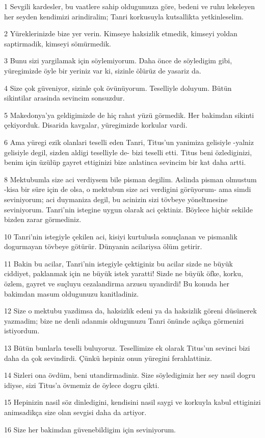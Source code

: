 \par 1 Sevgili kardesler, bu vaatlere sahip oldugumuza göre, bedeni ve ruhu lekeleyen her seyden kendimizi arindiralim; Tanri korkusuyla kutsallikta yetkinleselim.
\par 2 Yüreklerinizde bize yer verin. Kimseye haksizlik etmedik, kimseyi yoldan saptirmadik, kimseyi sömürmedik.
\par 3 Bunu sizi yargilamak için söylemiyorum. Daha önce de söyledigim gibi, yüregimizde öyle bir yeriniz var ki, sizinle ölürüz de yasariz da.
\par 4 Size çok güveniyor, sizinle çok övünüyorum. Teselliyle doluyum. Bütün sikintilar arasinda sevincim sonsuzdur.
\par 5 Makedonya'ya geldigimizde de hiç rahat yüzü görmedik. Her bakimdan sikinti çekiyorduk. Disarida kavgalar, yüregimizde korkular vardi.
\par 6 Ama yüregi ezik olanlari teselli eden Tanri, Titus'un yanimiza gelisiyle -yalniz gelisiyle degil, sizden aldigi teselliyle de- bizi teselli etti. Titus beni özlediginizi, benim için üzülüp gayret ettiginizi bize anlatinca sevincim bir kat daha artti.
\par 8 Mektubumla size aci verdiysem bile pisman degilim. Aslinda pisman olmustum -kisa bir süre için de olsa, o mektubun size aci verdigini görüyorum- ama simdi seviniyorum; aci duymaniza degil, bu acinizin sizi tövbeye yöneltmesine seviniyorum. Tanri'nin istegine uygun olarak aci çektiniz. Böylece hiçbir sekilde bizden zarar görmediniz.
\par 10 Tanri'nin istegiyle çekilen aci, kisiyi kurtulusla sonuçlanan ve pismanlik dogurmayan tövbeye götürür. Dünyanin acilariysa ölüm getirir.
\par 11 Bakin bu acilar, Tanri'nin istegiyle çektiginiz bu acilar sizde ne büyük ciddiyet, paklanmak için ne büyük istek yaratti! Sizde ne büyük öfke, korku, özlem, gayret ve suçluyu cezalandirma arzusu uyandirdi! Bu konuda her bakimdan masum oldugunuzu kanitladiniz.
\par 12 Size o mektubu yazdimsa da, haksizlik edeni ya da haksizlik göreni düsünerek yazmadim; bize ne denli adanmis oldugunuzu Tanri önünde açikça görmenizi istiyordum.
\par 13 Bütün bunlarla teselli buluyoruz. Tesellimize ek olarak Titus'un sevinci bizi daha da çok sevindirdi. Çünkü hepiniz onun yüregini ferahlattiniz.
\par 14 Sizleri ona övdüm, beni utandirmadiniz. Size söyledigimiz her sey nasil dogru idiyse, sizi Titus'a övmemiz de öylece dogru çikti.
\par 15 Hepinizin nasil söz dinledigini, kendisini nasil saygi ve korkuyla kabul ettiginizi animsadikça size olan sevgisi daha da artiyor.
\par 16 Size her bakimdan güvenebildigim için seviniyorum.

